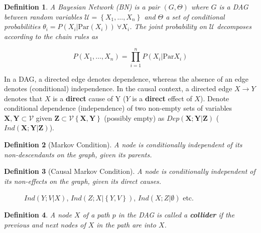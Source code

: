 \documentclass[a4paper]{article}
\newtheorem{definition}{Definition}
\begin{document}
\begin{definition}A Bayesian Network (BN) is a pair $(G,\Theta)$ where $G$ is a DAG between random variables $\mathcal{U} = \left\{X_1, \ldots, X_n \right\}$ and $\Theta$ a set of conditional probabilities $\theta_i = P(X_i | \text{Par}(X_i)) ~\forall X_i$. The joint probability on $\mathcal{U}$ decomposes according to the chain rules as 
	
	$$P(X_1,\ldots,X_n) = \prod_{i=1}^{n} P(X_i|\text{Par}{X_i})$$
\end{definition}

In a DAG, a directed edge denotes dependence, whereas the absence of an edge denotes (conditional) independence. In the causal context, a directed edge $X \rightarrow Y$ denotes that $X$ is a \textbf{direct} cause of Y ($Y$ is a \textbf{direct} effect of $X$). Denote conditional dependence (independence) of two non-empty sets of variables $\mathbf{X,Y} \subset \mathcal{V}$ given $\mathbf{Z} \subset \mathcal{V}\left\{ \mathbf{X,Y} \right\}$ (possibly empty)  as $Dep(\mathbf{X;Y | Z})$ ($Ind(\mathbf{X;Y | Z})$).
	
	\begin{definition}[Markov Condition]
		A node is conditionally independent of its non-descendants on the graph, given its parents.
	\end{definition}
	
	\begin{definition}[Causal Markov Condition]
		A node is conditionally independent of its non-effects on the graph, given its direct causes.
	\end{definition}

\begin{figure}
	\centering
	\caption{$Ind(Y;V|X)$, $Ind(Z;X | \left\{Y,V \right\})$, $Ind(X;Z | \emptyset)$ etc.}
\end{figure}

	\begin{definition}A node $X$ of a path $p$ in the DAG is called a \textbf{collider} if the previous and next nodes of $X$ in the path are into $X$.
\end{definition}
\end{document}
